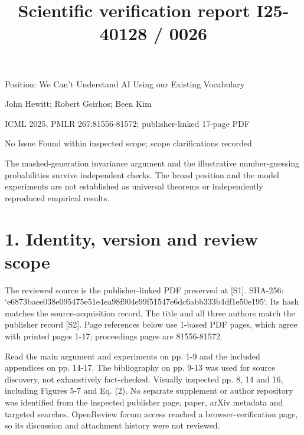 \documentclass[10pt]{article}
\title{Scientific verification report
I25-40128 / 0026}
\author{}
\date{}
\begin{document}
\maketitle
Position: We Can’t Understand AI Using our Existing Vocabulary\par
John Hewitt; Robert Geirhos; Been Kim\par
ICML 2025, PMLR 267:81556-81572; publisher-linked 17-page PDF\par
No Issue Found within inspected scope; scope clarifications recorded\par
The masked-generation invariance argument and the illustrative number-guessing probabilities survive independent checks. The broad position and the model experiments are not established as universal theorems or independently reproduced empirical results.\par
\section*{1. Identity, version and review scope}
The reviewed source is the publisher-linked PDF preserved at [S1]. SHA-256: `e6873baee038e095475e51e4ea98f904e99f51547e6dc6abb333b4df1e50e195`. Its hash matches the source-acquisition record. The title and all three authors match the publisher record [S2]. Page references below use 1-based PDF pages, which agree with printed pages 1-17; proceedings pages are 81556-81572.\par
Read the main argument and experiments on pp. 1-9 and the included appendices on pp. 14-17. The bibliography on pp. 9-13 was used for source discovery, not exhaustively fact-checked. Visually inspected pp. 8, 14 and 16, including Figures 5-7 and Eq. (2). No separate supplement or author repository was identified from the inspected publisher page, paper, arXiv metadata and targeted searches. OpenReview forum access reached a browser-verification page, so its discussion and attachment history were not reviewed.\par
\end{document}
